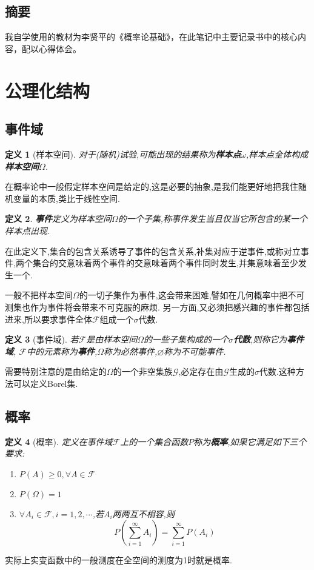 \documentclass[12pt,a4paper]{article}
\newtheorem{definition}{定义}[subsection] %
\begin{document}
\begin{center}
\section*{摘要}
\end{center}

我自学使用的教材为李贤平的《概率论基础》，在此笔记中主要记录书中的核心内容，配以心得体会。


{\centering\tableofcontents}

\newpage
\section{公理化结构}
\subsection{事件域}
\begin{definition}[样本空间]
    对于(随机)试验,可能出现的结果称为\textbf{样本点}$\omega$,样本点全体构成\textbf{样本空间}$\varOmega$.
\end{definition}
在概率论中一般假定样本空间是给定的,这是必要的抽象,是我们能更好地把我住随机变量的本质,类比于线性空间.
\begin{definition}
    \textbf{事件}定义为样本空间$\varOmega$的一个子集,称事件发生当且仅当它所包含的某一个样本点出现.
\end{definition}
在此定义下,集合的包含关系诱导了事件的包含关系,补集对应于逆事件,或称对立事件,两个集合的交意味着两个事件的交意味着两个事件同时发生,并集意味着至少发生一个.

一般不把样本空间$\varOmega$的一切子集作为事件,这会带来困难,譬如在几何概率中把不可测集也作为事件将会带来不可克服的麻烦.
另一方面,又必须把感兴趣的事件都包括进来,所以要求事件全体$\mathscr{F}$组成一个$\sigma$代数.
\begin{definition}[事件域]
    若$\mathscr{F}$是由样本空间$\varOmega$的一些子集构成的一个\textbf{$\sigma$代数},则称它为\textbf{事件域},
    $\mathscr{F}$中的元素称为\textbf{事件},$\varOmega$称为必然事件,$\varnothing$称为不可能事件.
\end{definition}
需要特别注意的是由给定的$\varOmega$的一个非空集族$\mathscr{G}$,必定存在由$\mathscr{G}$生成的$\sigma$代数.这种方法可以定义Borel集.
\subsection{概率}
\begin{definition}[概率]
    定义在事件域$\mathscr{F}$上的一个集合函数$P$称为\textbf{概率},如果它满足如下三个要求:
    \begin{enumerate}[label=(\roman*),font=\upshape]
        \item $P(A)\geq 0,\forall A \in \mathscr{F}$
        \item $P(\varOmega)=1$
        \item $\forall A_i \in \mathscr{F},i = 1,2, \cdots$,若$A_i$两两互不相容,则
        \[P(\sum_{i=1}^{\infty}A_i) = \sum_{i=1}^{\infty}P(A_i)\]
      \end{enumerate}
\end{definition}
实际上实变函数中的一般测度在全空间的测度为1时就是概率.
\end{document}

